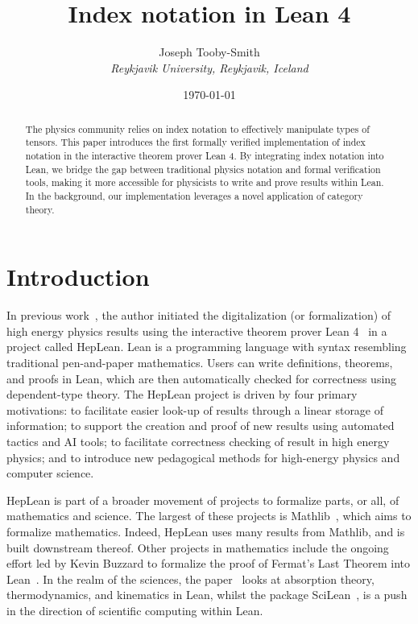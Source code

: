 \documentclass[a4paper, 11pt]{article}
\title{Index notation in Lean 4}
\author{Joseph Tooby-Smith \\ \textit{Reykjavik University, Reykjavik, Iceland}}
\date{\today}
\begin{document}
\maketitle
\vspace{-1cm}
\begin{abstract}
The physics community relies on index notation to effectively manipulate types of tensors.
This paper introduces the first formally verified implementation of index notation in the
interactive theorem prover Lean 4. By integrating index notation into Lean, we bridge the gap between 
traditional physics notation and formal verification tools, 
making it more accessible for physicists to write and prove results within Lean.
In the background, our implementation leverages a novel application of category theory.
\end{abstract}

\section{Introduction}

In previous work~\cite{HepLean}, the author initiated the digitalization (or formalization) 
of high energy physics 
results using the interactive theorem prover Lean 4~\cite{lean} in a project called HepLean. 
Lean is a
programming language with syntax resembling traditional pen-and-paper mathematics. 
Users can write definitions, theorems, and proofs in Lean,
which are then automatically checked for correctness using dependent-type theory.
The HepLean project is driven by four primary motivations: to facilitate easier look-up of results
 through a linear storage of information; to support the creation and proof of new results using 
 automated tactics and AI tools; to facilitate correctness checking of result in high energy physics; 
 and to introduce new pedagogical methods for high-energy physics and computer science.

HepLean is part of a broader movement of projects
to formalize parts, or all, of 
mathematics and science. The largest of these projects is Mathlib~\cite{mathlib}, which aims to formalize
mathematics. Indeed, HepLean uses many results from Mathlib, and is built downstream thereof.
Other projects in mathematics include the ongoing effort led by Kevin Buzzard to formalize the proof of Fermat's
Last Theorem into Lean~\cite{FLT}. 
In the realm of the sciences, the paper~\cite{josephson} looks at absorption theory, thermodynamics, and kinematics in Lean, 
whilst the package SciLean~\cite{SciLean}, is a push in the direction of scientific computing within Lean. 
\end{document}
